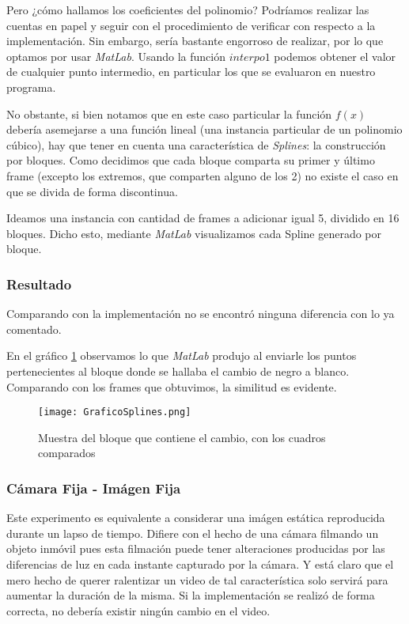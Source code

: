 Pero ¿c\'omo hallamos los coeficientes del polinomio? Podr\'iamos realizar las cuentas en papel y seguir con el procedimiento de verificar con respecto a la implementaci\'on. Sin embargo, ser\'ia bastante engorroso de realizar, por lo que optamos por usar \emph{MatLab}. Usando la funci\'on $interpo1$ podemos obtener el valor de cualquier punto intermedio, en particular los que se evaluaron en nuestro programa.

No obstante, si bien notamos que en este caso particular la funci\'on $f(x)$ debería asemejarse a una funci\'on lineal (una instancia particular de un polinomio cúbico), hay que tener en cuenta una característica de \emph{Splines}: la construcci\'on por bloques. Como decidimos que cada bloque comparta su primer y \'ultimo frame (excepto los extremos, que comparten alguno de los 2) no existe el caso en que se divida de forma discontinua.

Ideamos una instancia con cantidad de frames a adicionar igual 5, dividido en 16 bloques. Dicho esto, mediante \emph{MatLab} visualizamos cada Spline generado por bloque.

\subsubsection*{Resultado}

Comparando con la implementaci\'on no se encontr\'o ninguna diferencia con lo ya comentado.

En el gr\'afico \ref{fig:splineValidacion} observamos lo que \emph{MatLab} produjo al enviarle los puntos pertenecientes al bloque donde se hallaba el cambio de negro a blanco. Comparando con los frames que obtuvimos, la similitud es evidente.

\begin{figure}[h!]
  \centering
    \texttt{[image: GraficoSplines.png]}
     \caption{Muestra del bloque que contiene el cambio, con los cuadros comparados}\label{fig:splineValidacion}
\end{figure}
\noindent

\subsubsection{C\'amara Fija - Im\'agen Fija}

Este experimento es equivalente a considerar una im\'agen estática reproducida durante un lapso de tiempo. Difiere con el hecho de una c\'amara filmando un objeto inmóvil pues esta filmación puede tener alteraciones producidas por las diferencias de luz en cada instante capturado por la cámara. Y est\'a claro que el mero hecho de querer ralentizar un video de tal caracter\'istica solo servir\'a para aumentar la duraci\'on de la misma. Si la implementaci\'on se realiz\'o de forma correcta, no debería existir ning\'un cambio en el video.


